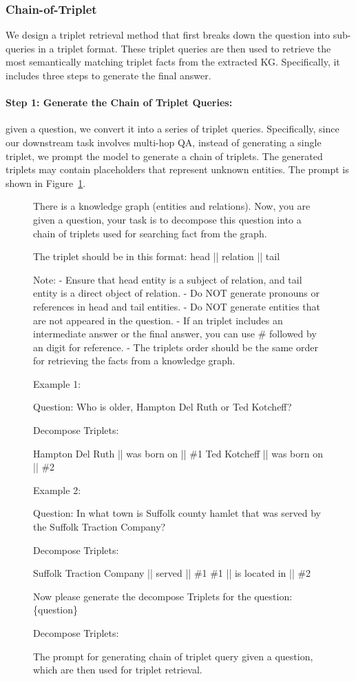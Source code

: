\documentclass{article} %
\begin{document}
\subsubsection{Chain-of-Triplet} 
\label{apd:chain-of-triplets}
We design a triplet retrieval method that first breaks down the question into sub-queries in a triplet format. These triplet queries are then used to retrieve the most semantically matching triplet facts from the extracted KG. Specifically, it includes three steps to generate the final answer. 
\paragraph{Step 1: Generate the Chain of Triplet Queries:}
given a question, we convert it into a series of triplet queries. Specifically, since our downstream task involves multi-hop QA, instead of generating a single triplet, we prompt the model to generate a chain of triplets. The generated triplets may contain placeholders that represent unknown entities. The prompt is shown in Figure~\ref{prompt-queries-triple}. 


\begin{figure}[!ht]
\tiny
\begin{mdframed}
There is a knowledge graph (entities and relations). Now, you are given a question, your task is to decompose this question into a chain of triplets used for searching fact from the graph.

The triplet should be in this format: head || relation || tail

Note:
- Ensure that head entity is a subject of relation, and tail entity is a direct object of relation.
- Do NOT generate pronouns or references in head and tail entities.
- Do NOT generate entities that are not appeared in the question.
- If an triplet includes an intermediate answer or the final answer, you can use \# followed by an digit for reference. 
- The triplets order should be the same order for retrieving the facts from a knowledge graph.  

Example 1:

Question: Who is older, Hampton Del Ruth or Ted Kotcheff?

Decompose Triplets:

Hampton Del Ruth || was born on || \#1 
Ted Kotcheff || was born on || \#2 

Example 2:

Question: In what town is Suffolk county hamlet that was served by the Suffolk Traction Company?

Decompose Triplets:

Suffolk Traction Company || served || \#1
\#1 || is located in || \#2

Now please generate the decompose Triplets for the question: \{question\}

Decompose Triplets:
\end{mdframed}
\caption{The prompt for generating chain of triplet query given a question, which are then used for triplet retrieval.}
\label{prompt-queries-triple}
\end{figure}
\end{document}
